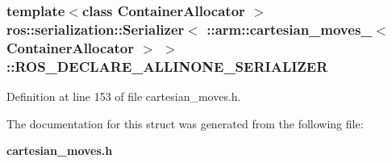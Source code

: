 \subsubsection[{\-R\-O\-S\-\_\-\-D\-E\-C\-L\-A\-R\-E\-\_\-\-A\-L\-L\-I\-N\-O\-N\-E\-\_\-\-S\-E\-R\-I\-A\-L\-I\-Z\-E\-R}]{\setlength{\rightskip}{0pt plus 5cm}template$<$class Container\-Allocator $>$ ros\-::serialization\-::\-Serializer$<$ \-::{\bf arm\-::cartesian\-\_\-moves\-\_\-}$<$ \-Container\-Allocator $>$ $>$\-::{\bf \-R\-O\-S\-\_\-\-D\-E\-C\-L\-A\-R\-E\-\_\-\-A\-L\-L\-I\-N\-O\-N\-E\-\_\-\-S\-E\-R\-I\-A\-L\-I\-Z\-E\-R}}\label{structros_1_1serialization_1_1Serializer_3_01_1_1arm_1_1cartesian__moves___3_01ContainerAllocator_01_4_01_4_a71b1b9e108e1f08b7f66e2053772e873}


\-Definition at line 153 of file cartesian\-\_\-moves.\-h.



\-The documentation for this struct was generated from the following file\-:\begin{DoxyCompactItemize}
\item 
{\bf cartesian\-\_\-moves.\-h}\end{DoxyCompactItemize}
